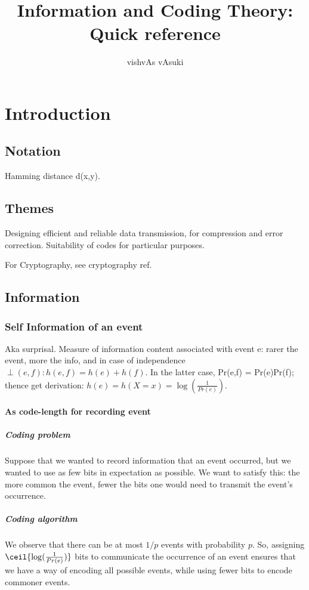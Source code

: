 \documentclass[oneside, article]{memoir}
\title{Information and Coding Theory: Quick reference}
\author{vishvAs vAsuki}
\begin{document}
\maketitle

\part{Introduction}
\chapter{Notation}
Hamming distance d(x,y).

\chapter{Themes}
Designing efficient and reliable data transmission, for compression and error correction. Suitability of codes for particular purposes.

For Cryptography, see cryptography ref.

\chapter{Information}
\section{Self Information of an event}
Aka surprisal. Measure of information content associated with event e: rarer the event, more the info, and in case of independence $\perp(e, f): h(e, f) = h(e)+h(f)$. In the latter case, Pr(e,f) = Pr(e)Pr(f); thence get derivation: $h(e) = h(X=x) = \log (\frac{1}{Pr(e)})$.

\subsection{As code-length for recording event}
\subsubsection{Coding problem}
Suppose that we wanted to record information that an event occurred, but we wanted to use as few bits in expectation as possible. We want to satisfy this: the more common the event, fewer the bits one would need to transmit the event's occurrence.

\subsubsection{Coding algorithm}
We observe that there can be at most $1/p$ events with probability $p$. So, assigning $\ceil{\log (\frac{1}{Pr(e)})}$ bits to communicate the occurrence of an event ensures that we have a way of encoding all possible events, while using fewer bits to encode commoner events.
\end{document}
